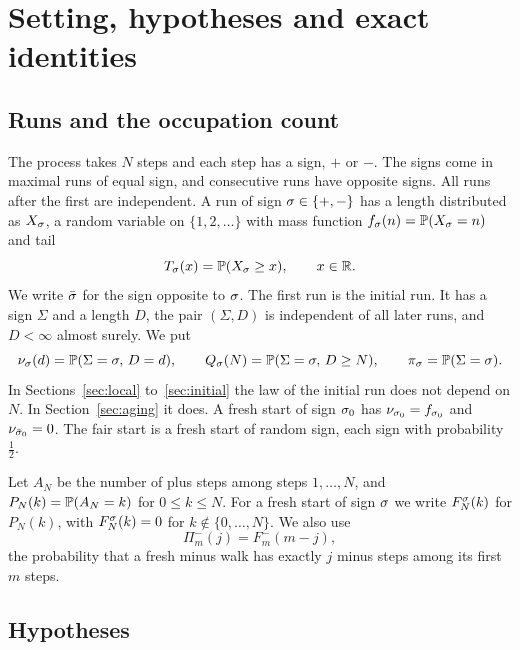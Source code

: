 \section{Setting, hypotheses and exact identities}\label{sec:setting}

\subsection{Runs and the occupation count}\label{sec:runs}

The process takes $N$ steps and each step has a sign, $\plus$ or $\minus$. The signs
come in maximal runs of equal sign, and consecutive runs have opposite signs. All
runs after the first are independent. A run of sign $\sigma\in\{{+},{-}\}$ has a
length distributed as $X_\sigma$, a random variable on $\{1,2,\dots\}$ with mass
function $f_\sigma(n)=\mathbb{P}(X_\sigma=n)$ and tail
\[
 T_\sigma(x)=\mathbb{P}(X_\sigma\ge x),\qquad x\in\mathbb{R} .
\]
We write $\bar\sigma$ for the sign opposite to $\sigma$. The first run is the initial run.
It has a sign $\Sigma$ and a length $D$, the pair $(\Sigma,D)$ is independent of all
later runs, and $D<\infty$ almost surely. We put
\[
 \nu_\sigma(d)=\mathbb{P}(\Sigma=\sigma,\,D=d),\qquad Q_\sigma(N)=\mathbb{P}(\Sigma=\sigma,\,D\ge N),
 \qquad \pi_\sigma=\mathbb{P}(\Sigma=\sigma).
\]
In Sections~\ref{sec:local} to~\ref{sec:initial} the law of the initial run does not
depend on $N$. In Section~\ref{sec:aging} it does. A fresh start of sign $\sigma_0$ has
$\nu_{\sigma_0}=f_{\sigma_0}$ and $\nu_{\bar\sigma_0}=0$. The fair start is a fresh start of random
sign, each sign with probability $\frac12$.

Let $A_N$ be the number of plus steps among steps $1,\dots,N$, and
$P_N(k)=\mathbb{P}(A_N=k)$ for $0\le k\le N$. For a fresh start of sign $\sigma$ we write
$F^\sigma_N(k)$ for $P_N(k)$, with $F^\sigma_N(k)=0$ for $k\notin\{0,\dots,N\}$. We also
use
\[
 \Pi^\minus_m(j)=F^\minus_m(m-j),
\]
the probability that a fresh minus walk has exactly $j$ minus steps among its first
$m$ steps.

\subsection{Hypotheses}\label{sec:hypotheses}

